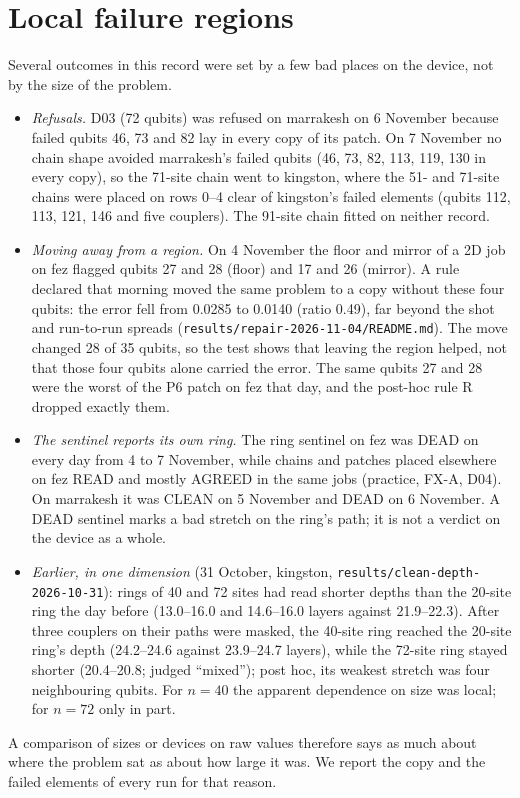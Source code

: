 \documentclass[10pt,a4paper]{article}
\begin{document}
\section{Local failure regions}\label{sec:regions}
Several outcomes in this record were set by a few bad places on the device, not by the size of the problem.
\begin{itemize}
\item \emph{Refusals.} D03 (72 qubits) was refused on marrakesh on 6 November because failed qubits 46, 73 and 82 lay
in every copy of its patch. On 7 November no chain shape avoided marrakesh's failed qubits (46, 73, 82, 113, 119,
130 in every copy), so the 71-site chain went to kingston, where the 51- and 71-site chains were placed on rows 0--4
clear of kingston's failed elements (qubits 112, 113, 121, 146 and five couplers). The 91-site chain fitted on
neither record.
\item \emph{Moving away from a region.} On 4 November the floor and mirror of a 2D job on fez flagged qubits 27 and
28 (floor) and 17 and 26 (mirror). A rule declared that morning moved the same problem to a copy without these four
qubits: the error fell from 0.0285 to 0.0140 (ratio 0.49), far beyond the shot and run-to-run spreads
(\texttt{results/repair-2026-11-04/README.md}). The move changed 28 of 35 qubits, so the test shows that leaving the
region helped, not that those four qubits alone carried the error. The same qubits 27 and 28 were the worst of the
P6 patch on fez that day, and the post-hoc rule R dropped exactly them.
\item \emph{The sentinel reports its own ring.} The ring sentinel on fez was DEAD on every day from 4 to 7 November,
while chains and patches placed elsewhere on fez READ and mostly AGREED in the same jobs (practice, FX-A, D04). On
marrakesh it was CLEAN on 5 November and DEAD on 6 November. A DEAD sentinel marks a bad stretch on the ring's path;
it is not a verdict on the device as a whole.
\item \emph{Earlier, in one dimension} (31 October, kingston, \texttt{results/clean-depth-2026-10-31}): rings of
40 and 72 sites had read shorter depths than the 20-site ring the day before (13.0--16.0 and 14.6--16.0 layers
against 21.9--22.3). After three couplers on their paths were masked, the 40-site ring reached the 20-site ring's
depth (24.2--24.6 against 23.9--24.7 layers), while the 72-site ring stayed shorter (20.4--20.8; judged ``mixed'');
post hoc, its weakest stretch was four neighbouring qubits. For $n = 40$ the apparent dependence on size was local;
for $n = 72$ only in part.
\end{itemize}
A comparison of sizes or devices on raw values therefore says as much about where the problem sat as about how
large it was. We report the copy and the failed elements of every run for that reason.
\end{document}
